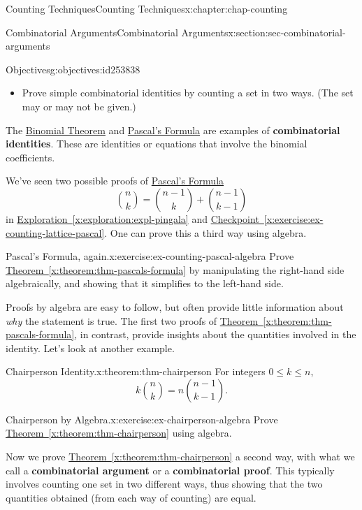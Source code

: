 \documentclass[oneside,10pt,]{book}
\newcommand{\xreffont}{\relax}
\newcommand{\terminology}[1]{\textbf{#1}}
\numberwithin{equation}{section}
\begin{document}
\begin{chapterptx}{Counting Techniques}{}{Counting Techniques}{}{}{x:chapter:chap-counting}
\begin{sectionptx}{Combinatorial Arguments}{}{Combinatorial Arguments}{}{}{x:section:sec-combinatorial-arguments}
\begin{objectives}{Objectives}{g:objectives:id253838}
%
\begin{itemize}[label=\textbullet]
\item{}Prove simple combinatorial identities by counting a set in two ways. (The set may or may not be given.)%
\end{itemize}
\end{objectives}
The \hyperref[x:theorem:thm-binomial]{Binomial Theorem} and \hyperref[x:theorem:thm-pascals-formula]{Pascal's Formula} are examples of \terminology{combinatorial identities}. These are identities or equations that involve the binomial coefficients.%
\par
We've seen two possible proofs of \hyperref[x:theorem:thm-pascals-formula]{Pascal's Formula}%
\begin{equation*}
\binom{n}{k} = \binom{n-1}{k} + \binom{n-1}{k-1}
\end{equation*}
in \hyperref[x:exploration:expl-pingala]{Exploration~{\xreffont\ref{x:exploration:expl-pingala}}} and \hyperref[x:exercise:ex-counting-lattice-pascal]{Checkpoint~{\xreffont\ref{x:exercise:ex-counting-lattice-pascal}}}. One can prove this a third way using algebra.%
\begin{inlineexercise}{Pascal's Formula, again.}{x:exercise:ex-counting-pascal-algebra}%
Prove \hyperref[x:theorem:thm-pascals-formula]{Theorem~{\xreffont\ref{x:theorem:thm-pascals-formula}}} by manipulating the right-hand side algebraically, and showing that it simplifies to the left-hand side.%
\end{inlineexercise}
Proofs by algebra are easy to follow, but often provide little information about \emph{why} the statement is true. The first two proofs of \hyperref[x:theorem:thm-pascals-formula]{Theorem~{\xreffont\ref{x:theorem:thm-pascals-formula}}}, in contrast, provide insights about the quantities involved in the identity. Let's look at another example.%
\begin{theorem}{Chairperson Identity.}{}{x:theorem:thm-chairperson}%
For integers \(0 \leq k \leq n\),%
\begin{equation*}
k\binom{n}{k} = n\binom{n-1}{k-1}\text{.}
\end{equation*}
%
\end{theorem}
\begin{inlineexercise}{Chairperson by Algebra.}{x:exercise:ex-chairperson-algebra}%
Prove \hyperref[x:theorem:thm-chairperson]{Theorem~{\xreffont\ref{x:theorem:thm-chairperson}}} using algebra.%
\end{inlineexercise}
Now we prove \hyperref[x:theorem:thm-chairperson]{Theorem~{\xreffont\ref{x:theorem:thm-chairperson}}} a second way, with what we call a \terminology{combinatorial argument} or a \terminology{combinatorial proof}. This typically involves counting one set in two different ways, thus showing that the two quantities obtained (from each way of counting) are equal.%

\end{sectionptx}
\end{chapterptx}
\end{document}
